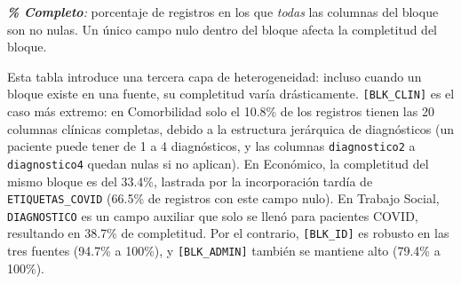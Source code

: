 \begin{table}[H]
\centering
\caption{Completitud por bloque semántico — comparativa}
\label{tab:bloques_completitud_comparativo}
\small
{}
\end{table}
{\footnotesize\textit{\textbf{\% Completo}:} porcentaje de registros en los que \emph{todas} las columnas del bloque son no nulas. Un único campo nulo dentro del bloque afecta la completitud del bloque.}

Esta tabla introduce una tercera capa de heterogeneidad: incluso cuando un bloque existe en una fuente, su completitud varía drásticamente. \texttt{[BLK\_CLIN]} es el caso más extremo: en Comorbilidad solo el 10.8\% de los registros tienen las 20 columnas clínicas completas, debido a la estructura jerárquica de diagnósticos (un paciente puede tener de 1 a 4 diagnósticos, y las columnas \texttt{diagnostico2} a \texttt{diagnostico4} quedan nulas si no aplican). En Económico, la completitud del mismo bloque es del 33.4\%, lastrada por la incorporación tardía de \texttt{ETIQUETAS\_COVID} (66.5\% de registros con este campo nulo). En Trabajo Social, \texttt{DIAGNOSTICO} es un campo auxiliar que solo se llenó para pacientes COVID, resultando en 38.7\% de completitud. Por el contrario, \texttt{[BLK\_ID]} es robusto en las tres fuentes (94.7\% a 100\%), y \texttt{[BLK\_ADMIN]} también se mantiene alto (79.4\% a 100\%).

